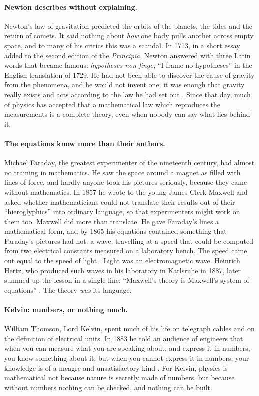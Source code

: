 \paragraph{Newton describes without explaining.}
Newton's law of gravitation predicted the orbits of the planets, the tides and the return of comets. It said nothing about \emph{how} one body pulls another across empty space, and to many of his critics this was a scandal. In 1713, in a short essay added to the second edition of the \emph{Principia}, Newton answered with three Latin words that became famous: \emph{hypotheses non fingo}, \enquote{I frame no hypotheses} in the English translation of 1729. He had not been able to discover the cause of gravity from the phenomena, and he would not invent one; it was enough that gravity really exists and acts according to the law he had set out \citep{Newton1713,Motte1729}. Since that day, much of physics has accepted that a mathematical law which reproduces the measurements is a complete theory, even when nobody can say what lies behind it.

\paragraph{The equations know more than their authors.}
Michael Faraday, the greatest experimenter of the nineteenth century, had almost no training in mathematics. He saw the space around a magnet as filled with lines of force, and hardly anyone took his pictures seriously, because they came without mathematics. In 1857 he wrote to the young James Clerk Maxwell and asked whether mathematicians could not translate their results out of their \enquote{hieroglyphics} into ordinary language, so that experimenters might work on them too. Maxwell did more than translate. He gave Faraday's lines a mathematical form, and by 1865 his equations contained something that Faraday's pictures had not: a wave, travelling at a speed that could be computed from two electrical constants measured on a laboratory bench. The speed came out equal to the speed of light \citep{Maxwell1865}. Light was an electromagnetic wave. Heinrich Hertz, who produced such waves in his laboratory in Karlsruhe in 1887, later summed up the lesson in a single line: \enquote{Maxwell's theory is Maxwell's system of equations} \citep{Hertz1893}. The theory \emph{was} its language.

\paragraph{Kelvin: numbers, or nothing much.}
William Thomson, Lord Kelvin, spent much of his life on telegraph cables and on the definition of electrical units. In 1883 he told an audience of engineers that when you can measure what you are speaking about, and express it in numbers, you know something about it; but when you cannot express it in numbers, your knowledge is of a meagre and unsatisfactory kind \citep{Kelvin1883}. For Kelvin, physics is mathematical not because nature is secretly made of numbers, but because without numbers nothing can be checked, and nothing can be built.

